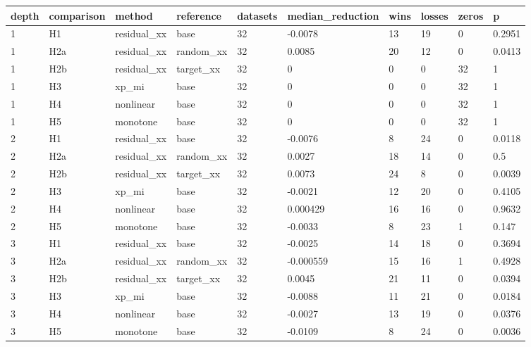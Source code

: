 \begin{tabular}{llllllllll}
\toprule
depth & comparison & method & reference & datasets & median\_reduction & wins & losses & zeros & p \\
\midrule
1 & H1 & residual\_xx & base & 32 & -0.0078 & 13 & 19 & 0 & 0.2951 \\
1 & H2a & residual\_xx & random\_xx & 32 & 0.0085 & 20 & 12 & 0 & 0.0413 \\
1 & H2b & residual\_xx & target\_xx & 32 & 0 & 0 & 0 & 32 & 1 \\
1 & H3 & xp\_mi & base & 32 & 0 & 0 & 0 & 32 & 1 \\
1 & H4 & nonlinear & base & 32 & 0 & 0 & 0 & 32 & 1 \\
1 & H5 & monotone & base & 32 & 0 & 0 & 0 & 32 & 1 \\
2 & H1 & residual\_xx & base & 32 & -0.0076 & 8 & 24 & 0 & 0.0118 \\
2 & H2a & residual\_xx & random\_xx & 32 & 0.0027 & 18 & 14 & 0 & 0.5 \\
2 & H2b & residual\_xx & target\_xx & 32 & 0.0073 & 24 & 8 & 0 & 0.0039 \\
2 & H3 & xp\_mi & base & 32 & -0.0021 & 12 & 20 & 0 & 0.4105 \\
2 & H4 & nonlinear & base & 32 & 0.000429 & 16 & 16 & 0 & 0.9632 \\
2 & H5 & monotone & base & 32 & -0.0033 & 8 & 23 & 1 & 0.147 \\
3 & H1 & residual\_xx & base & 32 & -0.0025 & 14 & 18 & 0 & 0.3694 \\
3 & H2a & residual\_xx & random\_xx & 32 & -0.000559 & 15 & 16 & 1 & 0.4928 \\
3 & H2b & residual\_xx & target\_xx & 32 & 0.0045 & 21 & 11 & 0 & 0.0394 \\
3 & H3 & xp\_mi & base & 32 & -0.0088 & 11 & 21 & 0 & 0.0184 \\
3 & H4 & nonlinear & base & 32 & -0.0027 & 13 & 19 & 0 & 0.0376 \\
3 & H5 & monotone & base & 32 & -0.0109 & 8 & 24 & 0 & 0.0036 \\
\bottomrule
\end{tabular}
